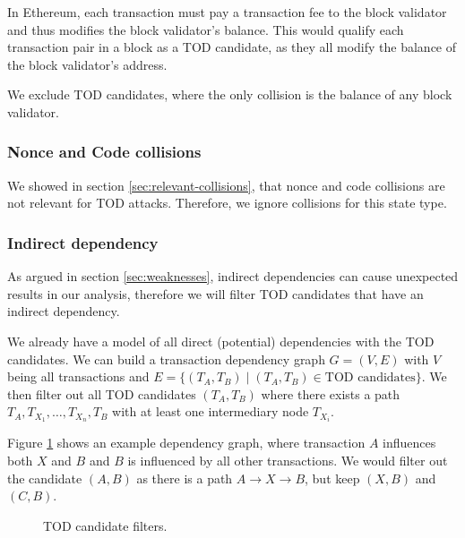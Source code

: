 \documentclass[draft,final]{vutinfth} %
\begin{document}
In Ethereum, each transaction must pay a transaction fee to the block validator and thus modifies the block validator's balance. This would qualify each transaction pair in a block as a TOD candidate, as they all modify the balance of the block validator's address.

We exclude TOD candidates, where the only collision is the balance of any block validator.


\subsubsection{Nonce and Code collisions}

We showed in section \ref{sec:relevant-collisions}, that nonce and code collisions are not relevant for TOD attacks. Therefore, we ignore collisions for this state type.

\subsubsection{Indirect dependency}

As argued in section \ref{sec:weaknesses}, indirect dependencies can cause unexpected results in our analysis, therefore we will filter TOD candidates that have an indirect dependency.

We already have a model of all direct (potential) dependencies with the TOD candidates. We can build a transaction dependency graph $G = (V, E)$ with $V$ being all transactions and $E = \{ (T_A, T_B) \mid (T_A, T_B) \in \text{TOD candidates} \}$. We then filter out all TOD candidates $(T_A, T_B)$ where there exists a path $T_A, T_{X_1}, \dots, T_{X_n}, T_B$ with at least one intermediary node $T_{X_i}$.

Figure \ref{fig:tod_candidate_dependency} shows an example dependency graph, where transaction $A$ influences both $X$ and $B$ and $B$ is influenced by all other transactions. We would filter out the candidate $(A, B)$ as there is a path $A \rightarrow X \rightarrow B$, but keep $(X, B)$ and $(C, B)$.

\begin{figure}[h]
    \centering
    \caption{TOD candidate filters.}
    \label{fig:tod_candidate_dependency}
\end{figure}
\end{document}
